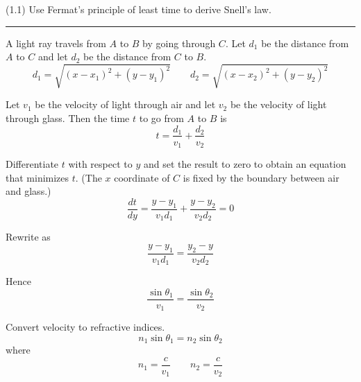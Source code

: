\documentclass[12pt]{article}
\begin{document}
(1.1)
Use Fermat's principle of least time to derive Snell's law.

\bigskip
\hrule

\begin{center}
\end{center}

A light ray travels from $A$ to $B$ by going through $C$.
Let $d_1$ be the distance from $A$ to $C$ and let $d_2$ be the distance from $C$ to $B$.
\begin{equation*}
d_1=\sqrt{(x-x_1)^2+(y-y_1)^2}\qquad
d_2=\sqrt{(x-x_2)^2+(y-y_2)^2}
\end{equation*}

Let $v_1$ be the velocity of light through air and let $v_2$ be the velocity of light through glass.
Then the time $t$ to go from $A$ to $B$ is
\begin{equation*}
t=\frac{d_1}{v_1}+\frac{d_2}{v_2}
\end{equation*}

Differentiate $t$ with respect to $y$ and set the result to zero to obtain an equation that minimizes $t$.
(The $x$ coordinate of $C$ is fixed by the boundary between air and glass.)
\begin{equation*}
\frac{dt}{dy}=\frac{y-y_1}{v_1d_1}+\frac{y-y_2}{v_2d_2}=0
\end{equation*}

Rewrite as
\begin{equation*}
\frac{y-y_1}{v_1d_1}=\frac{y_2-y}{v_2d_2}
\end{equation*}

Hence
\begin{equation*}
\frac{\sin\theta_1}{v_1}=\frac{\sin\theta_2}{v_2}
\end{equation*}

Convert velocity to refractive indices.
\begin{equation*}
n_1\sin\theta_1=n_2\sin\theta_2
\end{equation*}
where
\begin{equation*}
n_1=\frac{c}{v_1}\qquad n_2=\frac{c}{v_2}
\end{equation*}
\end{document}

